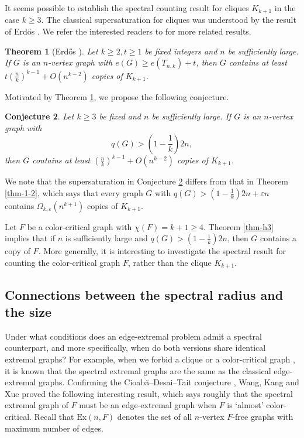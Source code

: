 \documentclass[11pt,a4paper]{article}
\theoremstyle{plain}
\newtheorem{theorem}{Theorem}[section]
\newtheorem{conj}[theorem]{Conjecture}
\theoremstyle{definition}
\begin{document}
It seems possible to establish the spectral counting result for cliques $K_{k+1}$ in the case $k \ge 3$. 
The classical supersaturation for cliques was  understood by the result of Erd\H{o}s \cite{Erd1969}. 
We refer the interested readers to \cite{LFP2024-triangular,LFP-count-bowtie,Mub2010,PY2017} for more related results. 

\begin{theorem}[Erd\H{o}s \cite{Erd1969}] \label{thm-count-cliques}
     Let $k\ge 2,t\ge 1$ be fixed integers and $n$ be sufficiently large. 
 If $G$ is an $n$-vertex graph with 
$e(G)\ge e(T_{n,k})+t $, then  
$G$ contains at least 
$t(\frac{n}{k})^{k-1} +O(n^{k-2})$ copies of $K_{k+1}$. 
\end{theorem}


Motivated by Theorem \ref{thm-count-cliques}, 
 we propose the following conjecture. 

 
\begin{conj} \label{conj-1}
    Let $k\ge 3$ be fixed and $n$ be sufficiently large. 
    If $G$ is an $n$-vertex graph with 
    \[ q(G)> \left(1- \frac{1}{k} \right)2n, \]
    then $G$ contains at least 
    $(\frac{n}{k})^{k-1} + O(n^{k-2})$ copies of $K_{k+1}$. 
\end{conj}



We note that the supersaturation in Conjecture \ref{conj-1} differs from that in Theorem \ref{thm-1-2}, which says that every graph $G$ with $q(G)> (1- \frac{1}{k})2n + \varepsilon n$ contains $\Omega_{k,\varepsilon} (n^{k+1})$ copies of $K_{k+1}$. 

Let $F$ be a color-critical graph with $\chi (F)=k+1\ge 4$. Theorem \ref{thm-h3} implies that if $n$ is sufficiently large and $q(G)> (1- \frac{1}{k})2n$, then $G$ contains a copy of $F$. 
More generally, it is interesting to investigate the spectral result for counting the color-critical graph $F$, rather than the clique $K_{k+1}$.  



\subsection{Connections between the spectral radius and the size}

Under what conditions does an edge-extremal problem admit a spectral counterpart, and more specifically, when do both versions share identical extremal graphs? 
For example, when we forbid a clique \cite{Niki2007laa2} or a color-critical graph \cite{N2009}, it is known that the spectral extremal graphs are the same as the classical edge-extremal graphs. 
Confirming the Cioab\u{a}--Desai--Tait conjecture \cite{CDT21}, 
Wang, Kang and Xue \cite{Wang2022} proved the following interesting result, which says roughly that the spectral extremal graph of $F$ must be an edge-extremal graph when $F$ is `almost' color-critical. 
Recall that $\mathrm{Ex}(n,F)$ denotes the set of all $n$-vertex $F$-free graphs
with maximum number of edges.  
\end{document}

